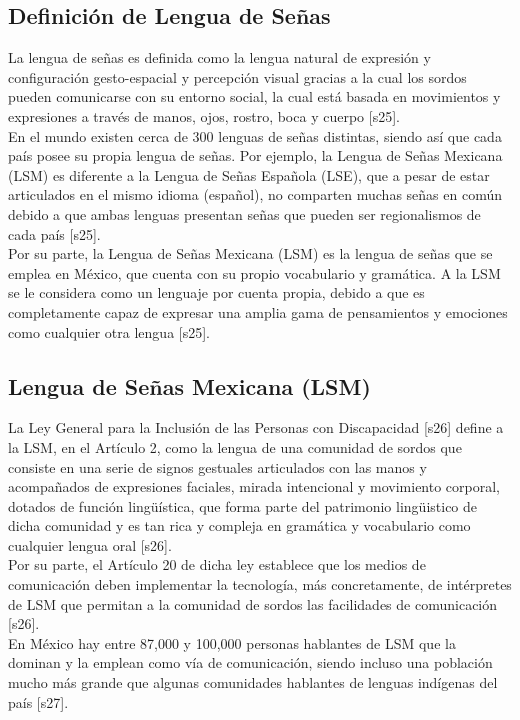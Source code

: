 \subsection{Definición de Lengua de Señas}
La lengua de señas es definida como la lengua natural de expresión y configuración gesto-espacial y percepción visual gracias a la cual los sordos pueden comunicarse con su entorno social, la cual está basada en movimientos y expresiones a través de manos, ojos, rostro, boca y cuerpo [s25].\\

En el mundo existen cerca de 300 lenguas de señas distintas, siendo así que cada país posee su propia lengua de señas. Por ejemplo, la Lengua de Señas Mexicana (LSM) es diferente a la Lengua de Señas Española (LSE), que a pesar de estar articulados en el mismo idioma (español), no comparten muchas señas en común debido a que ambas lenguas presentan señas que pueden ser regionalismos de cada país [s25].\\

Por su parte, la Lengua de Señas Mexicana (LSM) es la lengua de señas que se emplea en México, que cuenta con su propio vocabulario y gramática. A la LSM se le considera como un lenguaje por cuenta propia, debido a que es completamente capaz de expresar una amplia gama de pensamientos y emociones como cualquier otra lengua [s25].

\subsection{Lengua de Señas Mexicana (LSM)}
La Ley General para la Inclusión de las Personas con Discapacidad [s26] define a la LSM, en el Artículo 2, como la lengua de una comunidad de sordos que consiste en una serie de signos gestuales articulados con las manos y acompañados de expresiones faciales, mirada intencional y movimiento corporal, dotados de función lingüística, que forma parte del patrimonio lingüistico de dicha comunidad y es tan rica y compleja en gramática y vocabulario como cualquier lengua oral [s26].\\

Por su parte, el Artículo 20 de dicha ley establece que los medios de comunicación deben implementar la tecnología, más concretamente, de intérpretes de LSM que permitan a la comunidad de sordos las facilidades de comunicación [s26].\\

En México hay entre 87,000 y 100,000 personas hablantes de LSM que la dominan y la emplean como vía de comunicación, siendo incluso una población mucho más grande que algunas comunidades hablantes de lenguas indígenas del país [s27].\\

